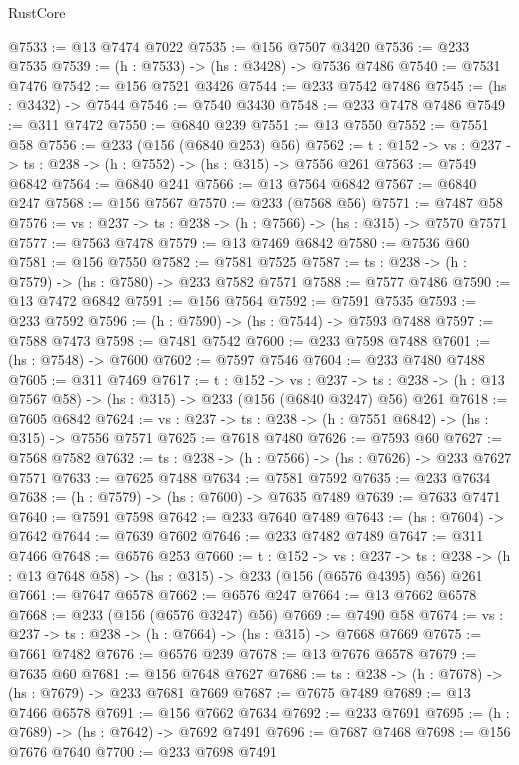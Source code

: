 \begin{lexlean}{RustCore}
\begin{coremodule}
@7533 := @13 @7474 @7022
@7535 := @156 @7507 @3420
@7536 := @233 @7535
@7539 := (h : @7533) -> (hs : @3428) -> @7536 @7486
@7540 := @7531 @7476
@7542 := @156 @7521 @3426
@7544 := @233 @7542 @7486
@7545 := (hs : @3432) -> @7544
@7546 := @7540 @3430
@7548 := @233 @7478 @7486
@7549 := @311 @7472
@7550 := @6840 @239
@7551 := @13 @7550
@7552 := @7551 @58
@7556 := @233 (@156 (@6840 @253) @56)
@7562 := {t : @152} -> {vs : @237} -> {ts : @238} -> (h : @7552) -> (hs : @315) -> @7556 @261
@7563 := @7549 @6842
@7564 := @6840 @241
@7566 := @13 @7564 @6842
@7567 := @6840 @247
@7568 := @156 @7567
@7570 := @233 (@7568 @56)
@7571 := @7487 @58
@7576 := {vs : @237} -> {ts : @238} -> (h : @7566) -> (hs : @315) -> @7570 @7571
@7577 := @7563 @7478
@7579 := @13 @7469 @6842
@7580 := @7536 @60
@7581 := @156 @7550
@7582 := @7581 @7525
@7587 := {ts : @238} -> (h : @7579) -> (hs : @7580) -> @233 @7582 @7571
@7588 := @7577 @7486
@7590 := @13 @7472 @6842
@7591 := @156 @7564
@7592 := @7591 @7535
@7593 := @233 @7592
@7596 := (h : @7590) -> (hs : @7544) -> @7593 @7488
@7597 := @7588 @7473
@7598 := @7481 @7542
@7600 := @233 @7598 @7488
@7601 := (hs : @7548) -> @7600
@7602 := @7597 @7546
@7604 := @233 @7480 @7488
@7605 := @311 @7469
@7617 := {t : @152} ->
  {vs : @237} ->
  {ts : @238} -> (h : @13 @7567 @58) -> (hs : @315) -> @233 (@156 (@6840 @3247) @56) @261
@7618 := @7605 @6842
@7624 := {vs : @237} -> {ts : @238} -> (h : @7551 @6842) -> (hs : @315) -> @7556 @7571
@7625 := @7618 @7480
@7626 := @7593 @60
@7627 := @7568 @7582
@7632 := {ts : @238} -> (h : @7566) -> (hs : @7626) -> @233 @7627 @7571
@7633 := @7625 @7488
@7634 := @7581 @7592
@7635 := @233 @7634
@7638 := (h : @7579) -> (hs : @7600) -> @7635 @7489
@7639 := @7633 @7471
@7640 := @7591 @7598
@7642 := @233 @7640 @7489
@7643 := (hs : @7604) -> @7642
@7644 := @7639 @7602
@7646 := @233 @7482 @7489
@7647 := @311 @7466
@7648 := @6576 @253
@7660 := {t : @152} ->
  {vs : @237} ->
  {ts : @238} -> (h : @13 @7648 @58) -> (hs : @315) -> @233 (@156 (@6576 @4395) @56) @261
@7661 := @7647 @6578
@7662 := @6576 @247
@7664 := @13 @7662 @6578
@7668 := @233 (@156 (@6576 @3247) @56)
@7669 := @7490 @58
@7674 := {vs : @237} -> {ts : @238} -> (h : @7664) -> (hs : @315) -> @7668 @7669
@7675 := @7661 @7482
@7676 := @6576 @239
@7678 := @13 @7676 @6578
@7679 := @7635 @60
@7681 := @156 @7648 @7627
@7686 := {ts : @238} -> (h : @7678) -> (hs : @7679) -> @233 @7681 @7669
@7687 := @7675 @7489
@7689 := @13 @7466 @6578
@7691 := @156 @7662 @7634
@7692 := @233 @7691
@7695 := (h : @7689) -> (hs : @7642) -> @7692 @7491
@7696 := @7687 @7468
@7698 := @156 @7676 @7640
@7700 := @233 @7698 @7491

\end{coremodule}
\end{lexlean}
